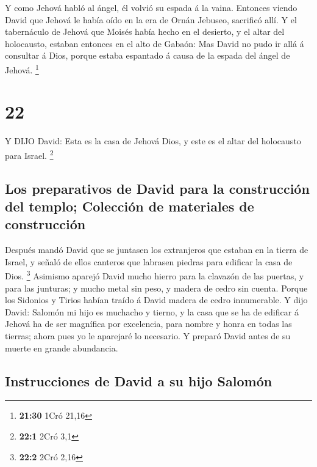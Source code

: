 Y como Jehová habló al ángel, él volvió su espada á la
vaina.  Entonces viendo David que Jehová le había oído en
la era de Ornán Jebuseo, sacrificó allí.  Y el tabernáculo
de Jehová que Moisés había hecho en el desierto, y el altar del
holocausto, estaban entonces en el alto de Gabaón: Mas David no pudo ir
allá á consultar á Dios, porque estaba espantado á causa de la espada
del ángel de Jehová. \footnote{\textbf{21:30} 1Cró 21,16}

\hypertarget{section-21}{%
\section{22}\label{section-21}}

 Y DIJO David: Esta es la casa de Jehová Dios, y este es el
altar del holocausto para Israel. \footnote{\textbf{22:1} 2Cró 3,1}

\hypertarget{los-preparativos-de-david-para-la-construcciuxf3n-del-templo-colecciuxf3n-de-materiales-de-construcciuxf3n}{%
\subsection{Los preparativos de David para la construcción del templo;
Colección de materiales de
construcción}\label{los-preparativos-de-david-para-la-construcciuxf3n-del-templo-colecciuxf3n-de-materiales-de-construcciuxf3n}}

 Después mandó David que se juntasen los extranjeros que
estaban en la tierra de Israel, y señaló de ellos canteros que labrasen
piedras para edificar la casa de Dios. \footnote{\textbf{22:2} 2Cró 2,16}
 Asimismo aparejó David mucho hierro para la clavazón de las
puertas, y para las junturas; y mucho metal sin peso, y madera de cedro
sin cuenta.  Porque los Sidonios y Tirios habían traído á
David madera de cedro innumerable.  Y dijo David: Salomón mi
hijo es muchacho y tierno, y la casa que se ha de edificar á Jehová ha
de ser magnífica por excelencia, para nombre y honra en todas las
tierras; ahora pues yo le aparejaré lo necesario. Y preparó David antes
de su muerte en grande abundancia.

\hypertarget{instrucciones-de-david-a-su-hijo-salomuxf3n}{%
\subsection{Instrucciones de David a su hijo
Salomón}\label{instrucciones-de-david-a-su-hijo-salomuxf3n}}

